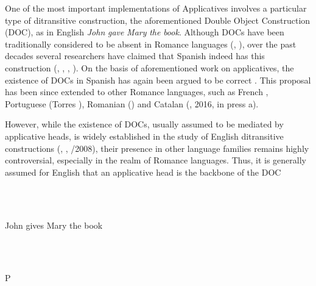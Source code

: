 \begin{stylePrrafodelista}
\textmd{One of the most important implementations of Applicatives involves a particular type of ditransitive construction, the aforementioned Double Object Construction (DOC), as in English} \textmd{\textit{John} \textit{gave} \textit{Mary} \textit{the} \textit{book}}\textmd{. Although DOCs have been traditionally considered to be absent in Romance languages (\citealt{Kayne1984}, \citealt{HolmbergPlatzack1995}), over the past decades several researchers have claimed that Spanish indeed has this construction (\citealt{Masullo1992}, \citealt{Demonte1995}, \citealt{Romero1997}, \citealt{Bleam2003}). On the basis of  aforementioned work on applicatives, the existence of DOCs in Spanish has again been argued to be correct \citep{Cuervo2003}. This proposal has been since extended to other Romance languages, such as French \citep{Fournier2010}, Portuguese (Torres \citealt{MoraisSalles2010}), Romanian (\citealt{DiaconescuRivero2007}) and Catalan (\citealt{Pineda2013}, 2016, in press a).} 
\end{stylePrrafodelista}

\begin{stylePrrafodelista}
\textmd{However, while the existence of DOCs, usually assumed to be mediated by applicative heads, is widely established in the study of English ditransitive constructions (\citealt{Baker1988}, \citealt{Marantz1993}, \citealt{Pylkkänen2002}/2008), their presence in other language families remains highly controversial, especially in the realm of Romance languages. Thus, it is generally assumed for English that an applicative head is the backbone of the DOC} \hyperlink{bookmark}{} \hyperlink{bookmark1}{}\textstyleHyperlink{:}
\end{stylePrrafodelista}

\begin{styleListNumberi}
\ea%
    \label{ex:key:1}
    \gll\\
        \\
    \glt
    \z

         John gives Mary the book
\end{styleListNumberi}

\begin{styleBodyA}
\ea%
    \label{ex:key:2}
    \gll\\
        \\
    \glt
    \z

           P
\end{styleBodyA}

